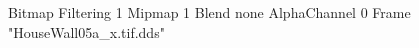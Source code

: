 {Bitmap
	{Filtering 1}
	{Mipmap 1}
	{Blend none}
	{AlphaChannel 0}
	{Frame "HouseWall05a_x.tif.dds"}
}
